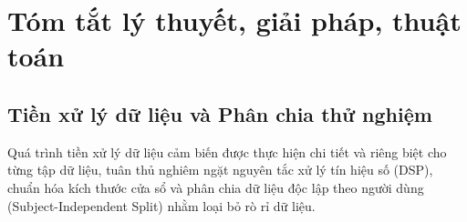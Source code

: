\usepackage[utf8]{inputenc}  %
\usepackage[T1]{fontenc}
\usepackage[vietnamese]{babel}
\usepackage{amsmath}    %
\usepackage{amstext}    %
\usepackage{amsfonts}   %
\usepackage{amssymb}    %

\section{Tóm tắt lý thuyết, giải pháp, thuật toán}
\subsection{Tiền xử lý dữ liệu và Phân chia thử nghiệm}
Quá trình tiền xử lý dữ liệu cảm biến được thực hiện chi tiết và riêng biệt cho từng tập dữ liệu, tuân thủ nghiêm ngặt nguyên tắc xử lý tín hiệu số (DSP), chuẩn hóa kích thước cửa sổ và phân chia dữ liệu độc lập theo người dùng (Subject-Independent Split) nhằm loại bỏ rò rỉ dữ liệu.
